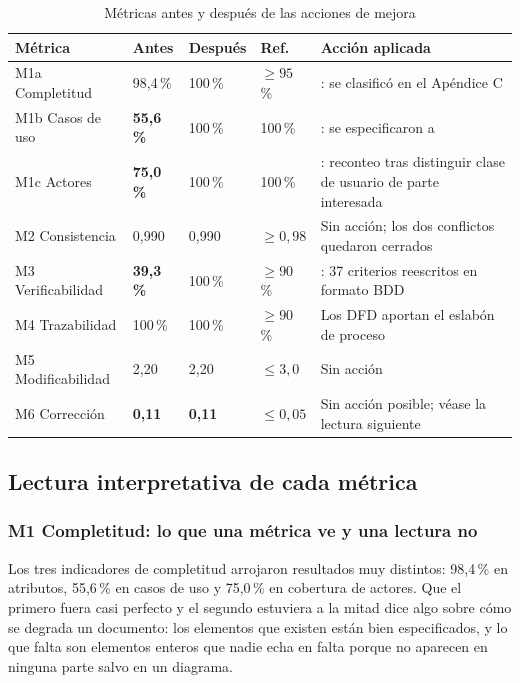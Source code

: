 \begin{table}[H]
\centering\footnotesize
\caption{Métricas antes y después de las acciones de mejora}
\label{tab:antes-despues}
\begin{tabular}{|L{3.6cm}|C{1.6cm}|C{1.6cm}|C{1.5cm}|L{6.0cm}|}
\hline
{}\textbf{Métrica} & \textbf{Antes} & \textbf{Después} & \textbf{Ref.} & \textbf{Acción aplicada}\\ \hline
M1a Completitud & 98,4\,\% & 100\,\% & $\geq 95$\,\% & : se clasificó  en el Apéndice C\\ \hline
{}M1b Casos de uso & \textbf{55,6\,\%} & 100\,\% & 100\,\% & : se especificaron  a \\ \hline
{}M1c Actores & \textbf{75,0\,\%} & 100\,\% & 100\,\% & : reconteo tras distinguir clase de usuario de parte interesada\\ \hline
M2 Consistencia & 0,990 & 0,990 & $\geq 0{,}98$ & Sin acción; los dos conflictos quedaron cerrados\\ \hline
{}M3 Verificabilidad & \textbf{39,3\,\%} & 100\,\% & $\geq 90$\,\% & : 37 criterios reescritos en formato BDD\\ \hline
M4 Trazabilidad & 100\,\% & 100\,\% & $\geq 90$\,\% & Los DFD aportan el eslabón de proceso\\ \hline
M5 Modificabilidad & 2,20 & 2,20 & $\leq 3{,}0$ & Sin acción\\ \hline
{}M6 Corrección & \textbf{0,11} & \textbf{0,11} & $\leq 0{,}05$ & Sin acción posible; véase la lectura siguiente\\ \hline
\end{tabular}
\end{table}

\subsection{Lectura interpretativa de cada métrica}

\subsubsection*{M1 Completitud: lo que una métrica ve y una lectura no}

Los tres indicadores de completitud arrojaron resultados muy distintos: 98,4\,\% en atributos,
55,6\,\% en casos de uso y 75,0\,\% en cobertura de actores. Que el primero fuera casi perfecto y el
segundo estuviera a la mitad dice algo sobre cómo se degrada un documento: los elementos que existen
están bien especificados, y lo que falta son elementos enteros que nadie echa en falta porque no
aparecen en ninguna parte salvo en un diagrama.

